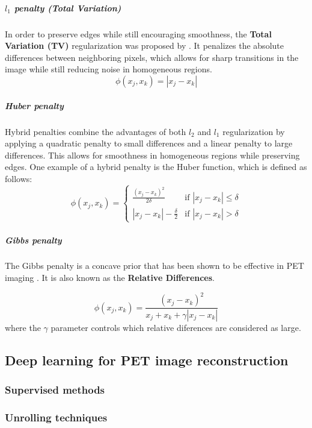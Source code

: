 \subparagraph{$l_1$ penalty (Total Variation)}

In order to preserve edges while still encouraging smoothness, the \textbf{Total Variation (TV)} regularization was proposed by \cite{Rudin1992}. It penalizes the absolute differences between neighboring pixels, which allows for sharp transitions in the image while still reducing noise in homogeneous regions.
\begin{equation}
    \phi(x_j, x_k) = |x_j - x_k|
\end{equation}

\subparagraph{Huber penalty}

Hybrid penalties combine the advantages of both $l_2$ and $l_1$ regularization by applying a quadratic penalty to small differences and a linear penalty to large differences. This allows for smoothness in homogeneous regions while preserving edges. One example of a hybrid penalty is the Huber function, which is defined as follows:
\begin{equation}
    \phi(x_j, x_k) = \begin{cases}
        \displaystyle \frac{(x_j - x_k)^2}{2 \delta}  & \text{if } |x_j - x_k| \leq \delta \\
        \displaystyle |x_j - x_k| - \frac{\delta}{2} & \text{if } |x_j - x_k| > \delta
    \end{cases}
\end{equation}

\subparagraph{Gibbs penalty}

The Gibbs penalty is a concave prior that has been shown to be effective in PET imaging \cite{Nuyts2002}. It is also known as the \textbf{Relative Differences}.

\begin{equation}
    \phi(x_j, x_k) = \frac{(x_j - x_k)^2}{x_j + x_k + \gamma |x_j - x_k|}
\end{equation}
where the $\gamma$ parameter controls which relative diferences are considered as large.

\subsection{Deep learning for PET image reconstruction}

\subsubsection{Supervised methods}
\subsubsection{Unrolling techniques}